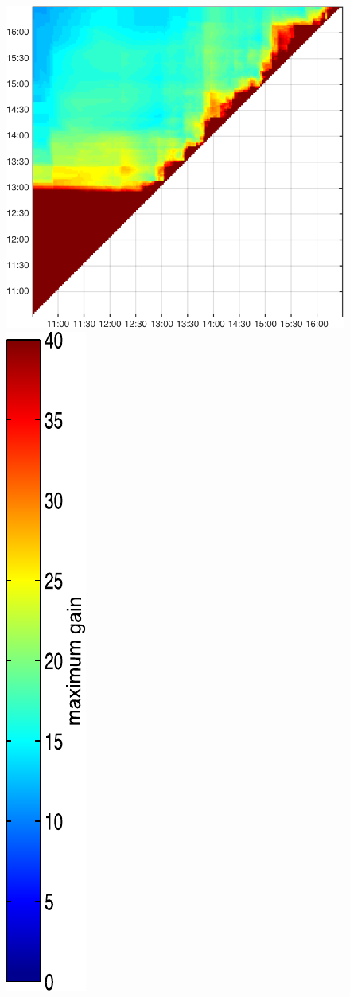 \begin{figure}
\begin{minipage}[c]{\mylength}
\includegraphics[valign=t,width=\eventswidth]{events/20130824-maxGain-local-events.png}
\includegraphics[valign=t,trim=2pt -8pt 0 5pt,width=\colorbarwidth,totalheight=\eventheight]{events/colorbar-40.pdf}

\end{minipage}
\end{figure}
